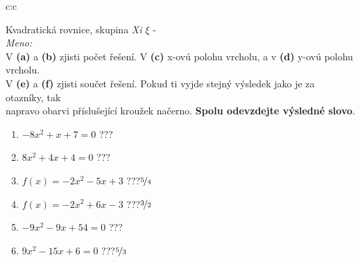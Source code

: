 \documentclass[10pt]{report}
\begin{document}
\clearpage
\thispagestyle{empty}
\begin{tabular}{c:c}
\begin{minipage}[c][99mm][t]{0.49\linewidth}
\begin{center}
\vspace{7mm}
{\huge Kvadratická rovnice, skupina \textit{Xi $\xi$} -}\\[4.5mm]
\textit{Meno:}\phantom{xxxxxxxxxxxxxxxxxxxxxxxxxxxxxxxxxxxxxxxxxxxxxxxxxxxxxxxxxxxxxxxxx}\\[3.5mm]
V \textbf{(a)} a \textbf{(b)} zjisti počet řešení. V \textbf{(c)} x-ovú polohu vrcholu, a v \textbf{(d)} y-ovú polohu vrcholu.\\V \textbf{(e)} a \textbf{(f)} zjisti součet řešení. Pokud ti vyjde stejný výsledek jako je za otazníky, tak\\napravo obarvi příslušející kroužek načerno. \textbf{Spolu odevzdejte výsledné slovo}.\\[3mm]
\begin{minipage}{0.77\linewidth}
\begin{center}
\begin{varwidth}{\textwidth}
\begin{enumerate}
\large
\item $-8x^2+x+7=0$\quad \dotfill\; ???\;\dotfill {}
\item $8x^2+4x+4=0$\quad \dotfill\; ???\;\dotfill {}
\item $f(x)=-2x^2-5x+3$\quad \dotfill\; ???\;\dotfill \quad $\nicefrac{5}{4}$
\item $f(x)=-2x^2+6x-3$\quad \dotfill\; ???\;\dotfill \quad $\nicefrac{3}{2}$
\item $-9x^2-9x+54=0$\quad \dotfill\; ???\;\dotfill {}
\item $9x^2-15x+6=0$\quad \dotfill\; ???\;\dotfill \quad $\nicefrac{5}{3}$
\end{enumerate}
\end{varwidth}
\end{center}
\end{minipage}

\end{center}
\end{minipage}
\end{tabular}
\end{document}
